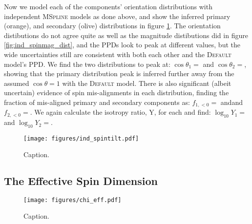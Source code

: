 Now we model each of the components' orientation distributions with independent \textsc{MSpline} models as done above, and show the inferred 
primary (orange), and secondary (olive) distributions in figure \ref{fig:ind_spintilt_dist}. The orientation distibutions do not agree quite as well as 
the magnitude distibutions did in figure \ref{fig:ind_spinmag_dist}, and the PPDs look to peak at different values, but the wide uncertainties still are 
consistent with both each other and the \textsc{Default} model's PPD. We find the two distributions to peak at: $\cos{\theta_1}=$\result{$\CIPlusMinus{\macros[MSplineIndependentCompSpins][peakCosTilt1]}$} 
and $\cos{\theta_2}=$\result{$\CIPlusMinus{\macros[MSplineIndependentCompSpins][peakCosTilt2]}$}, showing that the primary distribution peak is inferred further away 
from the assumed $\cos{\theta}=1$ with the \textsc{Default} model. There is also significant (albeit uncertain) evidence of spin mis-alignments in each distribution, finding 
the fraction of mis-aligned primary and secondary components as: $f_{1,<0}=$\result{$\CIPlusMinus{\macros[MSplineIndependentCompSpins][negFrac1]}$} andand $f_{2,<0}=$\result{$\CIPlusMinus{\macros[MSplineIndependentCompSpins][negFrac2]}$}.
We again calculate the isotropy ratio, Y, for each and find: $\log_{10}Y_1=$ and 
$\log_{10}Y_2=$.

\begin{figure}
        \texttt{[image: figures/ind\_spintilt.pdf]}
        \caption{Caption.}
        \label{fig:ind_spintilt_dist}
\end{figure}

\subsection{The Effective Spin Dimension}

\begin{figure}
    \texttt{[image: figures/chi\_eff.pdf]}
    \caption{Caption.}
    \label{fig:chieff_dist}
\end{figure}

